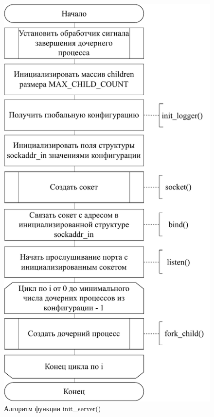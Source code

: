 \begin{figure}[H]
	\centering
	\includegraphics[scale=0.8]{img/init_server.pdf}
	\caption{Алгоритм функции init\_server()}
	\label{scheme-init-server}
\end{figure}

\newpage

